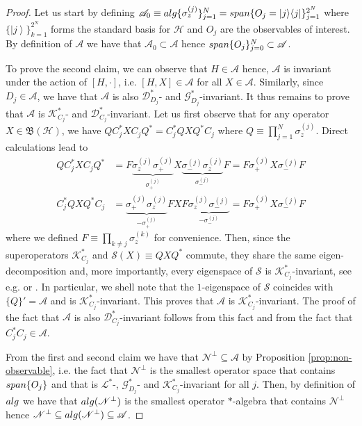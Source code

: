 \documentclass[aihp,12pt]{imsart}
\newcommand{\Dc}{\mathcal{D}}
\newcommand{\Gc}{\mathcal{G}}
\newcommand{\Hc}{\mathcal{H}}
\newcommand{\Sc}{\mathcal{S}}
\newcommand{\Kc}{\mathcal{K}}
\newcommand{\Lc}{\mathcal{L}}
\newcommand{\As}{\mathscr{A}}
\newcommand{\Ns}{\mathscr{N}}
\newcommand{\Bf}{\mathfrak{B}}
\newcommand{\Span}{{\rm span}}
\newcommand{\alg}{{\rm alg}}
\newcommand{\ket}[1]{\left| #1 \right>}
\newcommand{\ketbra}[2]{\left\vert #1 \middle>\middle< #2 \right\vert}
\theoremstyle{theorem}
\theoremstyle{definition}
\theoremstyle{remark}
\begin{document}
\begin{proof}
Let us start by defining $\As_0\equiv\alg\{\sigma_z^{(j)}\}_{j=1}^N = \Span\{O_j = \ketbra{j}{j}\}_{j=1}^{2^{N}}$ where $\{\ket{j}\}_{k=1}^{2^N}$ forms the standard basis for $\Hc$ and $O_j$ are the observables of interest. By definition of $\As$ we have that $\As_0\subset\As$ hence $\Span\{O_j\}_{j=0}^N\subset \As$.



To prove the second claim, we can observe that $H\in\As$ hence, $\As$ is invariant under the action of $[H,\cdot]$, i.e. $[H,X]\in\As$ for all $X\in\As$. Similarly, since $D_j\in\As$, we have that $\As$ is also $\Dc_{D_j}^*$- and $\Gc_{D_j}^*$-invariant. 
It thus remains to prove that $\As$ is $\Kc_{C_j}^*$- and $\Dc_{C_j}^*$-invariant. Let us first observe that for any operator $X\in\Bf(\Hc)$, we have $Q C_j^* X C_j Q^* = C_j^* Q X Q^* C_j$ where $Q\equiv \prod_{j=1}^N \sigma_z^{(j)}$. Direct calculations lead to 
\begin{align*}
    Q C_j^* X C_j Q^* &= F \underbrace{\sigma_z^{(j)} \sigma_+^{(j)}}_{\sigma_+^{(j)}} X \underbrace{\sigma_-^{(j)} \sigma_z^{(j)}}_{\sigma_-^{(j)}} F = F  \sigma_+^{(j)} X \sigma_-^{(j)} F\\
    C_j^* Q X Q^* C_j &= \underbrace{\sigma_+^{(j)} \sigma_z^{(j)}}_{-\sigma_+^{(j)}} F X F \underbrace{\sigma_z^{(j)} \sigma_-^{(j)}}_{-\sigma_-^{(j)}} = F \sigma_+^{(j)} X \sigma_-^{(j)} F
\end{align*}
where we defined $F\equiv \prod_{k\neq j} \sigma_z^{(k)}$ for convenience. Then, since the superoperators $\Kc_{C_j}^*$ and $\Sc(X)\equiv Q X Q^*$ commute, they share the same eigen-decomposition and, more importantly, every eigenspace of $\Sc$ is $\Kc_{C_j}^*$-invariant, see e.g. \cite[Sec. V.B]{prxq2024} or \cite{Buča_2012}. In particular, we shell note that the $1$-eigenspace of $\Sc$ coincides with $\{Q\}' = \As$ and is $\Kc_{C_j}^*$-invariant. This proves that $\As$ is $\Kc_{C_j}^*$-invariant. The proof of the fact that $\As$ is also $\Dc_{C_j}^*$-invariant follows from this fact and from the fact that $C_j^* C_j\in\As$.    

From the first and second claim we have that $\Ns^\perp\subseteq\As$ by  Proposition \ref{prop:non-observable}, i.e. the fact that $\Ns^\perp$ is the smallest operator space that contains $\Span\{O_j\}$ and that is $\Lc^*$-, $\Gc_{D_j}^*$- and $\Kc_{C_j}^*$-invariant for all $j$. Then, by definition of $\alg$ we have that $\alg(\Ns^\perp)$ is the smallest operator $*$-algebra that contains $\Ns^\perp$ hence $\Ns^\perp\subseteq\alg(\Ns^\perp)\subseteq\As$. 
\end{proof}
\end{document}
